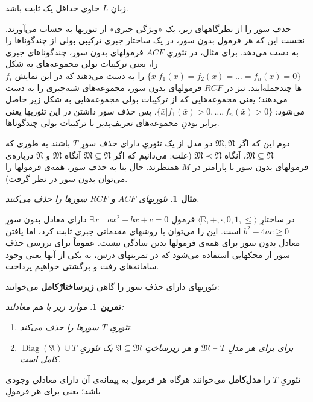 \documentclass[12pt,a4paper]{report}
\theoremstyle{colorhead}
\newtheorem{tam}[thm]{تمرین}
\newtheorem{mesal}[thm]{مثال}
\DeclareMathOperator{\diag}{Diag}
\begin{document}
زبانِ
$L$
حاوی 
حداقل یک ثابت باشد.
\par 
حذف سور را از نظرگاههای زیر،
 یک «ویژگی جبری» از تئوریها به حساب می‌آورند.  نخست این که هر فرمول بدون سور، در یک ساختار جبری ترکیبی بولی 
 از چندگوناها 
 را به دست می‌دهد. برای مثال، در تئوریِ
  $ACF$
  فرمولهای 
  بدون سور، چندگوناهای جبری را، یعنی ترکیبات بولی مجموعه‌های به شکل
  $\{\bar{x}|f_1(\bar{x})=f_2(\bar{x})=\ldots=f_n(\bar{x})=0\}$
   را به دست می‌دهند که در این نمایش
  $f_i$
  ها چندجمله‌ایند. 
  نیز در
  $RCF$
  فرمولهای بدون سور، 
  مجموعه‌های شبه‌جبری 
  را به دست می‌دهند؛ یعنی مجموعه‌هایی که از ترکیبات بولی مجموعه‌هایی به شکل زیر حاصل می‌شود:
  $\{\bar{x}|f_1(\bar{x})>0, \ldots, f_n(\bar{x})>0\}$.
  پس 
  حذف سور داشتن در این تئوریها یعنی برابر بودنِ مجموعه‌های تعریف‌پذیر با 
  ترکیبات بولی چندگوناها. 
  \par 
 دوم این که اگر
  $\mathfrak{M},\mathfrak{N}$
  دو
  مدل از یک تئوریِ دارای حذف سورِ
  $T$
  باشند به طوری که
  $\mathfrak{M}\subseteq \mathfrak{N}$،
  آنگاه
  $\mathfrak{M}\prec \mathfrak{N}$
  (علت: می‌دانیم که اگر
  $\mathfrak{M}\subseteq \mathfrak{N}$
  آنگاه 
  $\mathfrak{M}$
  و
  $\mathfrak{N}$
  درباره‌ی 
  فرمولهای بدون سور با پارامتر در
  $M$
  همنظرند. حال
  بنا به حذف سور، همه‌ی فرمولها را می‌توان بدون سور در نظر گرفت).
  \begin{mesal}
  تئوریهای
  $ACF$
  و
  $RCF$
  سورها را حذف می‌کنند.
  \end{mesal}
در ساختارِ
$\langle \mathbb{R},+,\cdot,0,1,\leq\rangle$
 فرمولِ
 $\exists x\quad ax^2+bx+c=0$
 دارای معادل بدون سورِ
 $b^2-4ac\geq 0$
 است. این را می‌توان با روشهای مقدماتی جبری ثابت کرد، اما یافتن معادل بدون سور برای همه‌ی فرمولها بدین سادگی نیست. عموماً برای بررسی حذف سور از محکهایی استفاده می‌شود که در تمرینهای درس، به یکی از آنها یعنی وجود سامانه‌های رفت و برگشتی خواهیم پرداخت. 
 \par 
 تئوریهای دارای حذف سور را گاهی 
\textbf{زیرساختارْکامل}
 می‌خوانند:
 \begin{tam}
موارد زیر با هم معادلند:
 \begin{enumerate}
 \item 
  تئوریِ
  $T$
  سورها را حذف می‌کند.
 \item 
 $\diag(\mathfrak{A})\cup T$
 برای 
 برای هر مدلِ
 $\mathfrak{M}\models T$
 و هر زیرساختِ
  $\mathfrak{A}\subseteq \mathfrak{M}$
  یک تئوریِ
  کامل است. 	
 \end{enumerate}
 \end{tam}
تئوریِ
$T$
را 
\textbf{مدل‌کامل}
 می‌خوانند هرگاه هر فرمول به پیمانه‌ی آن دارای معادلی وجودی باشد؛ یعنی برای هر فرمولِ
\end{document}
